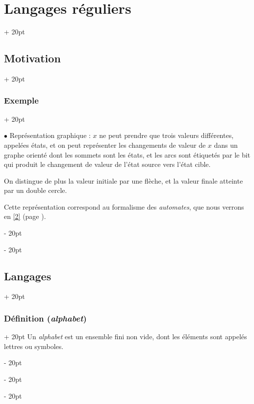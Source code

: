 \documentclass[a4paper, 12pt, twoside]{article}
\newcommand{\ind}[1][20pt]{\advance\leftskip + #1}
\newcommand{\deind}[1][20pt]{\advance\leftskip - #1}
\newenvironment{indt}[2][20pt]{#2 \par \ind[#1]}{\par \deind} %
\begin{document}
\begin{indt}{\section{Langages réguliers}}
\begin{indt}{\subsection{Motivation}}
\begin{indt}{\subsubsection{Exemple}}
                \vspace{12pt}
                
                $\bullet$ Représentation graphique : $x$ ne peut prendre que trois valeurs différentes, appelées états, et on peut représenter les changements de valeur de $x$ dans un graphe orienté dont les sommets sont les états, et les arcs sont étiquetés par le bit qui produit le changement de valeur de l'état source vers l'état cible.

                \begin{center}
                \end{center}

                On distingue de plus la valeur initiale par une flèche, et la valeur finale atteinte par un double cercle.

                Cette représentation correspond au formalisme des \emph{automates}, que nous verrons en \ref{2} (page \pageref{2}).
            \end{indt}
        \end{indt}

        \vspace{12pt}
        
        \begin{indt}{\subsection{Langages}}
            \begin{indt}{\subsubsection{Définition (\textit{alphabet})}}
                Un \emph{alphabet} est un ensemble fini non vide, dont les éléments sont appelés lettres ou symboles.


\end{indt}
\end{indt}
\end{indt}
\end{document}
